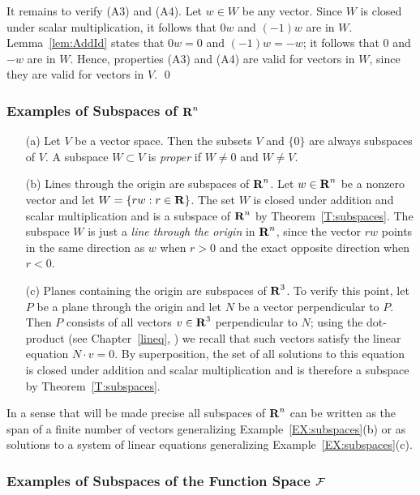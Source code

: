 It remains to verify (A3) and (A4).  Let $w\in W$ be any vector.
Since $W$ is closed under scalar multiplication, it follows that
$0w$ and $(-1)w$ are in $W$. Lemma~\ref{lem:AddId} states that
$0w=0$ and $(-1)w=-w$; it follows that $0$ and $-w$ are in $W$.
Hence, properties (A3) and (A4) are valid for vectors in $W$,
since they are valid for vectors in $V$.  \qed

\subsubsection*{Examples of Subspaces of $\mbox{$\bf{R}$}^n$}

\begin{exam}  \label{EX:subspaces}
{\rm
\begin{itemize}
\item[(a)] Let $V$ be a vector space.  Then the subsets $V$ and $\{0\}$ are
always subspaces of $V$.  A subspace $W\subset V$ is {\em proper\/} if
$W\neq 0$ and $W\neq V$. 
\item[(b)] Lines through the origin are subspaces of $\mbox{$\bf{R}$}^n$.  Let $w\in \mbox{$\bf{R}$}^n$
be a nonzero vector and let $W=\{rw:r\in\mbox{$\bf{R}$}\}$.  The set $W$ is closed under
addition and scalar multiplication and is a subspace of $\mbox{$\bf{R}$}^n$ by 
Theorem~\ref{T:subspaces}.
The subspace $W$ is just a {\em line through the origin\/} in $\mbox{$\bf{R}$}^n$, since
the vector $rw$ points in the same direction as $w$ when $r>0$ and the exact
opposite direction when $r<0$.
\item[(c)]  Planes containing the origin are subspaces of $\mbox{$\bf{R}$}^3$.  To verify
this point, let $P$ be a plane through the origin and let $N$ be a vector
perpendicular to $P$.  Then $P$ consists of all vectors
$v\in\mbox{$\bf{R}$}^3$ perpendicular to $N$; using the dot-product (see Chapter~\ref{lineq},
) we recall that such vectors satisfy the linear equation
$N\cdot v = 0$.  By superposition, the set of all
solutions to this equation is closed under addition and scalar multiplication
and is therefore a subspace by Theorem~\ref{T:subspaces}.
\end{itemize}
}
\end{exam}
In a sense that will be made precise all subspaces of $\mbox{$\bf{R}$}^n$ can be written
as the span of a finite number of vectors generalizing
Example~\ref{EX:subspaces}(b) or as solutions to a system of linear equations
generalizing Example~\ref{EX:subspaces}(c).


\subsubsection*{Examples of Subspaces of the Function Space ${\cal F}$}

